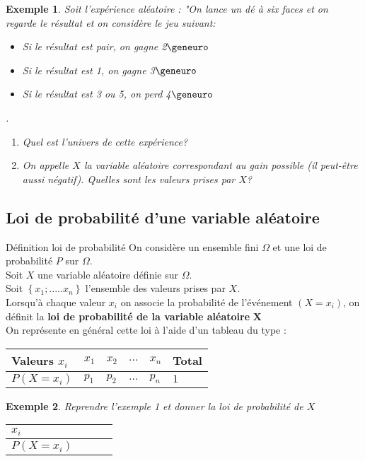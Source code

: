\documentclass[10pt,a4paper]{article}
\renewcommand{\arraystretch}{}
\theoremstyle{break}
\newtheorem{Ex}{Exemple}
\begin{document}
\newpage
	\begin{Ex}
		Soit l'expérience aléatoire : "On lance un dé à six faces et on regarde le résultat et on considère le jeu suivant:
		\begin{itemize}
			\item Si le résultat est pair, on gagne 2$\geneuro$
			\item Si le résultat est 1, on gagne 3$\geneuro$
			\item Si le résultat est 3 ou 5, on perd 4$\geneuro$
		\end{itemize}.
		\begin{enumerate}
			\item Quel est l'univers de cette expérience?
			\item On appelle $X$ la variable aléatoire correspondant au gain possible (il peut-être aussi négatif). Quelles sont les valeurs prises par $X$?
		\end{enumerate}
	\end{Ex}
	\subsection{Loi de probabilité d'une variable aléatoire}
		\begin{bclogo}[couleur = yellow!30, arrondi = 0.1,logo=\bcbook]{Définition loi de probabilité}
		On considère un ensemble fini $\Omega$ et une loi de probabilité $P$ sur $\Omega$. \\
		Soit $X$ une variable aléatoire définie sur $\Omega$.\\
		Soit $\left\lbrace x_{1} ; ..... x_{n}\right\rbrace $ l'ensemble des valeurs prises par $X$.\\
		Lorsqu'à chaque valeur $x_{i}$  on associe la probabilité de l'événement $(X=x_{i})$, on définit 
		la \textbf{loi de probabilité de la variable aléatoire} $\boldsymbol{X}$\\
		On représente en général cette loi à l'aide d'un tableau du type :\\\begin{center}
			\begin{tabular}{|>{\centering}p{3cm}|>{\centering}p{1cm}|>{\centering}p{1cm}|>{\centering}p{1cm}|>{\centering}p{1cm}|>{\centering}p{2cm}|}
				\hline
				\rule[-1ex]{0pt}{4ex} Valeurs $x_i$ & $x_1$ & $x_2$ & $\dots$ & $x_n$  & Total \tabularnewline\hline
				\rule[-1ex]{0pt}{4ex} $P(X=x_i)$ & $ p_1$ & $ p_2 $ & $ \dots $ & $ p_n $  & $1$\tabularnewline\hline
			\end{tabular}
		\end{center}
		\end{bclogo}
\begin{Ex}
	Reprendre l'exemple 1 et donner la loi de probabilité de $X$\\
	\renewcommand{\arraystretch}{2}
		\begin{tabular}{|p{3cm}|p{3cm}|p{3cm}|p{3cm}|}
		\hline
		$x_i$&&&\\
		\hline
		$P(X=x_i)$&&&\\
		\hline
	\end{tabular}
\end{Ex}
	
\end{document}
